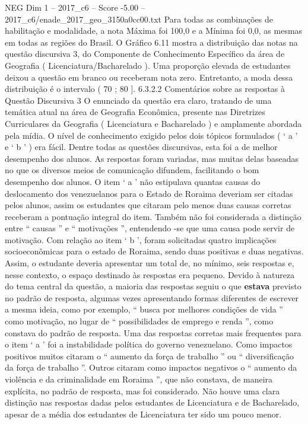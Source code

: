 \begin{textsample}{NEG Dim 1 – 2017\_c6 – Score -5.00 – 2017\_c6/enade\_2017\_geo\_3150a0cc00.txt}
Para todas as combinações de habilitação e modalidade, a nota Máxima foi 100,0 e a Mínima foi 0,0, as mesmas em todas as regiões do Brasil.
O Gráfico 6.11 mostra a distribuição das notas na questão discursiva 3, do Componente de Conhecimento Específico da área de Geografia ( Licenciatura/Bacharelado ).
Uma proporção elevada de estudantes deixou a questão em branco ou receberam nota zero.
Entretanto, a moda dessa distribuição é o intervalo ( 70 ; 80 ]. 6.3.2.2 Comentários sobre as respostas à Questão Discursiva 3 O enunciado da questão era claro, tratando de uma temática atual na área de Geografia Econômica, presente nas Diretrizes Curriculares da Geografia ( Licenciatura e Bacharelado ) e amplamente abordada pela mídia.
O nível de conhecimento exigido pelos dois tópicos formulados ( ‘ a ’ e ‘ b ’ ) era fácil.
Dentre todas as questões discursivas, esta foi a de melhor desempenho dos alunos.
As respostas foram variadas, mas muitas delas baseadas no que os diversos meios de comunicação difundem, facilitando o bom desempenho dos alunos.
O item ‘ a ’ não estipulava quantas causas do deslocamento dos venezuelanos para o Estado de Roraima deveriam ser citadas pelos alunos, assim os estudantes que citaram pelo menos duas causas corretas receberam a pontuação integral do item.
Também não foi considerada a distinção entre “ causas ” e “ motivações ”, entendendo -se que uma causa pode servir de motivação.
Com relação ao item ‘ b ’, foram solicitadas quatro implicações socioeconômicas para o estado de Roraima, sendo duas positivas e duas negativas.
Assim, o estudante deveria apresentar um total de, no mínimo, seis respostas e, nesse contexto, o espaço destinado às respostas era pequeno.
Devido à natureza do tema central da questão, a maioria das respostas seguiu o que \textbf{estava} previsto no padrão de resposta, algumas vezes apresentando formas diferentes de escrever a mesma ideia, como por exemplo, “ busca por melhores condições de vida ” como motivação, no lugar de “ possibilidades de emprego e renda ”, como constava do padrão de resposta.
Uma das respostas corretas mais frequentes para o item ‘ a ’ foi a instabilidade política do governo venezuelano.
Como impactos positivos muitos citaram o “ aumento da força de trabalho ” ou “ diversificação da força de trabalho ”.
Outros citaram como impactos negativos o “ aumento da violência e da criminalidade em Roraima ”, que não constava, de maneira explícita, no padrão de resposta, mas foi considerado.
Não houve uma clara distinção nas respostas dadas pelos estudantes de Licenciatura e de Bacharelado, apesar de a média dos estudantes de Licenciatura ter sido um pouco menor.

\end{textsample}
